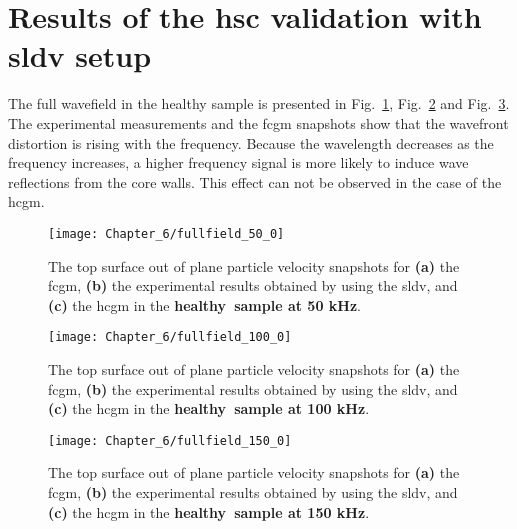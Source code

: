 \section{Results of the \acs{hsc} validation with \acs{sldv} setup}
\label{sec:resuls_sldv}
The full wavefield in the healthy sample is presented in Fig.~\ref{fig:fullfield_50_0}, Fig.~\ref{fig:fullfield_100_0} and Fig.~\ref{fig:fullfield_150_0}.
The experimental measurements and the \ac{fcgm} snapshots show that the wavefront distortion is rising with the frequency.
Because the wavelength decreases as the frequency increases, a higher frequency signal is more likely to induce wave reflections from the core walls.
This effect can not be observed in the case of the \ac{hcgm}.

\begin{figure}[!hbt]
	\begin{center}
		\texttt{[image: Chapter\_6/fullfield\_50\_0]}
	\end{center}
	\caption{The top surface out of plane particle velocity snapshots for \textbf{(a)} the \acf{fcgm}, \textbf{(b)} the experimental results obtained by using the \acf{sldv}, and \textbf{(c)} the \acf{hcgm} in the \textbf{healthy~sample at 50 kHz}.}
	\label{fig:fullfield_50_0}
\end{figure}
\begin{figure}[!hbt]
	\begin{center}
		\texttt{[image: Chapter\_6/fullfield\_100\_0]}
	\end{center}
	\caption{The top surface out of plane particle velocity snapshots for \textbf{(a)} the \acf{fcgm}, \textbf{(b)} the experimental results obtained by using the \acf{sldv}, and \textbf{(c)} the \acf{hcgm} in the \textbf{healthy~sample at 100 kHz}.}
	\label{fig:fullfield_100_0}
\end{figure}
\begin{figure}[!hbt]
	\begin{center}
		\texttt{[image: Chapter\_6/fullfield\_150\_0]}
	\end{center}
	\caption{The top surface out of plane particle velocity snapshots for \textbf{(a)} the \acf{fcgm}, \textbf{(b)} the experimental results obtained by using the \acf{sldv}, and \textbf{(c)} the \acf{hcgm} in the \textbf{healthy~sample at 150 kHz}.}
	\label{fig:fullfield_150_0}
\end{figure}


